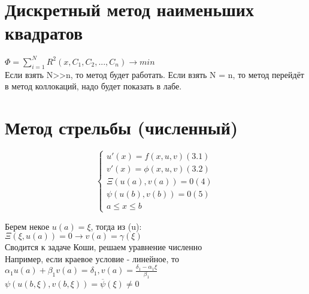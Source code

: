 \section{Дискретный метод наименьших квадратов}
$\Phi = \sum\limits_{i=1}^{N} R^{2}(x, C_{1}, C_{2}, ..., C_{n}) \rightarrow min$\\
Если взять N>>n, то метод будет работать. Если взять N = n, то метод перейдёт в метод коллокаций, надо будет показать в лабе.

\section{Метод стрельбы (численный)}
\begin{equation}
\begin{cases}
u'(x) = f(x, u, v) (3.1)\\
v'(x) = \phi(x, u, v) (3.2)\\
\Xi(u(a), v(a)) = 0 (4)\\
\psi(u(b), v(b)) = 0 (5)\\
a \leqslant x \leqslant b
\end{cases}
\end{equation}

Берем некое $u(a) = \xi$, тогда из (u):\\
$\Xi(\xi, u(a)) = 0 \rightarrow v(a) = \gamma(\xi)$\\
Сводится к задаче Коши, решаем уравнение численно\\
Например, если краевое условие - линейное, то $\alpha_{1} u(a) + \beta_{1}v(a) = \delta_{1}, v(a) = \frac{\delta_{1} - \alpha_{1} \xi}{\beta_{1}}$\\

$\psi(u(b, \xi), v(b, \xi)) = \overline{\psi}(\xi) \neq 0$\\




